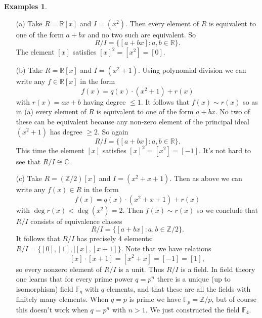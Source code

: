 \documentclass [12pt,oneside,a4paper,mathscr]{amsart}
\theoremstyle{definition}
\newtheorem{examples}[thm]{Examples}
\newcommand {\C}{\mathbb C}
\renewcommand{\leq}{\leqslant}
\renewcommand{\geq}{\geqslant}
\newcommand{\R}{\mathbb{R}}
\newcommand{\Z}{\mathbb Z}
\newcommand{\isom}{\cong}
\begin{document}
\begin{examples}
\begin{itemize}
\item[(a)] Take $R=\R[x]$ and $I=(x^2)$. Then every element of $R$ is equivalent to one of the form $a+bx$
 and no two such are equivalent. So
 \[R/I=\{[a+bx]:a,b\in\R\}.\]
 The element $[x]$ satisfies $[x]^2=[x^2]=[0]$.
 
 \item[(b)] Take $R=\R[x]$ and $I=(x^2+1)$. Using polynomial division we can write any $f\in \R[x]$ in the form
 \[f(x)=q(x) \cdot (x^2+1) + r(x)\]
 with $r(x)=ax+b$ having degree $\leq 1$. It follows that $f(x)\sim r(x)$ so as in (a) every element of $R$
  is equivalent to one of the form $a+bx$. No two of these can be equivalent because any non-zero element
  of the principal ideal $(x^2+1)$ has degree $\geq 2$.
  So again
 \[R/I=\{[a+bx]:a,b\in\R\}.\]
 This time the element $[x]$ satisfies $[x]^2=[x^2]=[-1]$. It's not hard to see that $R/I\isom \C$.
 
 \item[(c)] Take $R=(\Z/2)[x]$ and $I=(x^2+x+1)$. Then as above we can write any $f(x)\in R$ in the form
\[f(x)=q(x)\cdot( x^2+x+1) + r(x)\]
with $\deg r(x)< \deg (x^2)=2$. Then $f(x)\sim r(x)$ so we conclude that $R/I$ consists of equivalence classes
\[R/I=\{[a+bx]:a,b\in \Z/2\}.\]
It follows that $R/I$  has precisely 4 elements: $R/I=\{[0],[1],][x],[x+1]\}$. Note that we have relations
\[ [x]\cdot [x+1]=[x^2+x] = [-1] = [1],\]
so every nonzero element of $R/I$ is a unit. Thus $R/I$ is a field.
In field theory one learns that for every prime power
$q=p^n$ there is a unique (up to isomorphism) field $\mathbb{F}_q$ with $q$ elements, and that these are
all the fields with finitely many elements.
 When $q=p$ is prime we have $\mathbb{F}_p=\Z/p$, but of course
this doesn't work when $q=p^n$ with $n>1$. We just constructed the field  $\mathbb{F}_4$.


\end{itemize}
\end{examples}
\end{document}

